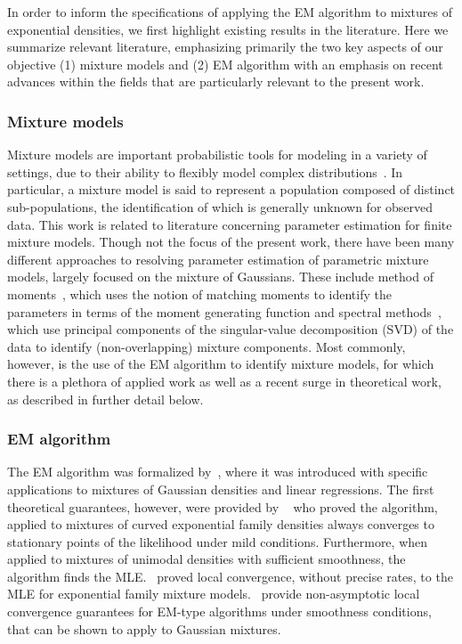 \documentclass[runningheads]{llncs}
\begin{document}
In order to inform the specifications of applying the EM algorithm to mixtures
of exponential densities, we first highlight existing results in the literature.
Here we summarize relevant literature, emphasizing primarily the two key aspects of
our objective (1) mixture models and (2) EM algorithm with an emphasis on
recent advances within the fields that are particularly relevant to the present work.

\subsubsection{Mixture models}
Mixture models are important probabilistic tools for modeling in a
variety of settings, due to their ability to flexibly model complex
distributions~\cite{mclachlan2019finite, lindsay1995mixture}. In particular, a
mixture model is said
to represent a population composed of distinct sub-populations, the
identification of which is generally unknown for observed data.
This work is related to literature concerning parameter estimation for finite
mixture models. Though not the focus of the present work, there have been many
different approaches to resolving parameter estimation of parametric mixture
models, largely focused on the mixture of Gaussians. These include method of
moments~\cite{anandkumar2012method}, which uses the notion of matching moments
to identify the parameters in terms of the moment generating function and
spectral methods~\cite{vempala2004spectral, kannan2005spectral}, which use
principal components of the singular-value decomposition (SVD) of the data to
identify (non-overlapping) mixture components.
Most commonly, however, is the use of the EM algorithm to identify mixture
models, for which there is a plethora of applied work as well as a recent surge
in theoretical work, as described in further detail below.


\subsubsection{EM algorithm}
The EM algorithm was formalized by~\cite{dempster1977maximum}, where it
was introduced with specific applications to mixtures of Gaussian densities and
linear regressions. The first theoretical guarantees, however, were provided by
~\cite{wu1983convergence} who proved the algorithm, applied to mixtures of
curved exponential family densities always converges to stationary points of the
likelihood under mild conditions. Furthermore, when applied to mixtures of
unimodal densities with sufficient smoothness, the algorithm finds the MLE.~\cite{redner1984mixture} proved local convergence, without precise rates, to
the MLE for exponential family mixture
models.~\cite{balakrishnan2017statistical} provide non-asymptotic local
convergence guarantees for EM-type algorithms under smoothness conditions, that
can be shown to apply to Gaussian mixtures.
\end{document}
